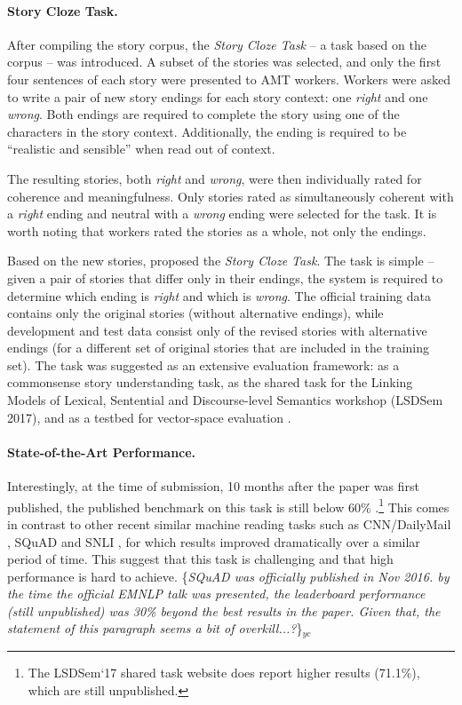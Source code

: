 \documentclass[11pt,a4paper]{article}
\newcommand{\yc}[1]{{\color{bblue}\{\textit{#1}\}$_{yc}$}}
\begin{document}
\paragraph{Story Cloze Task.}
After compiling the story corpus, the {\it Story Cloze Task} -- a task based on the corpus -- was introduced.
A subset of the stories was selected, and only the first four sentences of each story were presented to AMT workers.
Workers were asked to write a pair of new story endings for each story context: one {\it right} and one {\it wrong}.
Both endings are required to complete the story using one of the characters in the story context. 
Additionally,  the ending is required to be ``realistic and sensible'' \cite{Mostafazadeh:2016} when read out of context.

The resulting stories, both {\it right} and {\it wrong}, were then individually rated for coherence and meaningfulness. 
Only stories rated as simultaneously coherent with a {\it right} ending and neutral with a {\it wrong} ending were selected for the task. 
It is worth noting that workers rated the stories as a whole, not only the endings.

Based on the new stories, \citet{Mostafazadeh:2016} proposed the {\it Story Cloze Task}. 
The task is simple -- given a pair of stories that differ only in their endings, the system is required to determine which ending is {\it right} and which is {\it wrong}. 
The official training data contains only the original stories (without alternative endings), while development and test data consist only of the revised stories with alternative endings (for a different set of original stories that are included in the training set). 
The task was suggested as an extensive evaluation framework:
as a commonsense story understanding task, 
as the shared task for the  Linking Models of Lexical, Sentential and Discourse-level Semantics workshop (LSDSem 2017), and as a testbed for vector-space evaluation \cite{mostafazadeh2016story}.

\paragraph{State-of-the-Art Performance.}
Interestingly, at the time of submission, 10 months after the paper was first published, the published benchmark on this task is still below 60\% \cite{Salle:2016}.\footnote{The LSDSem`17 shared task website does report higher results (71.1\%), which are still unpublished.}
This comes in contrast to other recent similar machine reading tasks such as CNN/DailyMail \cite{hermann2015teaching}, SQuAD \cite{rajpurkar2016squad} and SNLI \cite{bowman2015large}, for which results improved dramatically over a similar period of time.
This suggest that this task is challenging and that high performance is hard to achieve.
\yc{SQuAD was officially published in Nov 2016. by the time the official EMNLP talk was presented, the leaderboard performance (still unpublished) was  30\% beyond the best results in the paper. Given that, the statement of this paragraph seems a bit of overkill...?}
\end{document}
